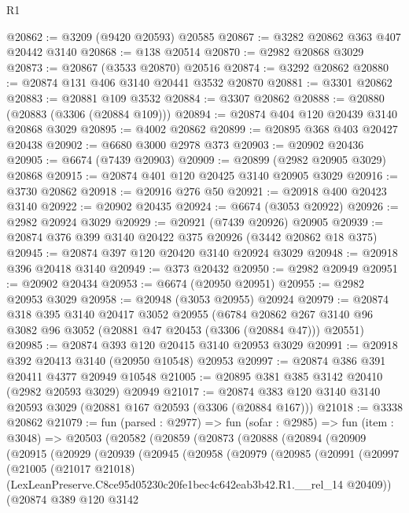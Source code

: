 \begin{lexlean}{R1}
\begin{coremodule}
@20862 := @3209 (@9420 @20593) @20585
@20867 := @3282 @20862 @363 @407 @20442 @3140
@20868 := @138 @20514
@20870 := @2982 @20868 @3029
@20873 := @20867 (@3533 @20870) @20516
@20874 := @3292 @20862
@20880 := @20874 @131 @406 @3140 @20441 @3532 @20870
@20881 := @3301 @20862
@20883 := @20881 @109 @3532
@20884 := @3307 @20862
@20888 := @20880 (@20883 (@3306 (@20884 @109)))
@20894 := @20874 @404 @120 @20439 @3140 @20868 @3029
@20895 := @4002 @20862
@20899 := @20895 @368 @403 @20427 @20438
@20902 := @6680 @3000 @2978 @373
@20903 := @20902 @20436
@20905 := @6674 (@7439 @20903)
@20909 := @20899 (@2982 @20905 @3029) @20868
@20915 := @20874 @401 @120 @20425 @3140 @20905 @3029
@20916 := @3730 @20862
@20918 := @20916 @276 @50
@20921 := @20918 @400 @20423 @3140
@20922 := @20902 @20435
@20924 := @6674 (@3053 @20922)
@20926 := @2982 @20924 @3029
@20929 := @20921 (@7439 @20926) @20905
@20939 := @20874 @376 @399 @3140 @20422 @375 @20926 (@3442 @20862 @18 @375)
@20945 := @20874 @397 @120 @20420 @3140 @20924 @3029
@20948 := @20918 @396 @20418 @3140
@20949 := @373 @20432
@20950 := @2982 @20949
@20951 := @20902 @20434
@20953 := @6674 (@20950 @20951)
@20955 := @2982 @20953 @3029
@20958 := @20948 (@3053 @20955) @20924
@20979 := @20874
    @318
    @395
    @3140
    @20417
    @3052
    @20955
    (@6784 @20862 @267 @3140 @96 @3082 @96 @3052 (@20881 @47 @20453 (@3306 (@20884 @47))) @20551)
@20985 := @20874 @393 @120 @20415 @3140 @20953 @3029
@20991 := @20918 @392 @20413 @3140 (@20950 @10548) @20953
@20997 := @20874 @386 @391 @20411 @4377 @20949 @10548
@21005 := @20895 @381 @385 @3142 @20410 (@2982 @20593 @3029) @20949
@21017 := @20874 @383 @120 @3140 @3140 @20593 @3029 (@20881 @167 @20593 (@3306 (@20884 @167)))
@21018 := @3338 @20862
@21079 := fun (parsed : @2977) =>
  fun (sofar : @2985) =>
  fun (item : @3048) =>
  @20503
    (@20582
      (@20859
        (@20873
          (@20888
            (@20894
              (@20909
                (@20915
                  (@20929
                    (@20939
                      (@20945
                        (@20958
                          (@20979
                            (@20985
                              (@20991
                                (@20997
                                  (@21005
                                    (@21017 @21018)
                                    (LexLeanPreserve.C8ce95d05230c20fe1bec4c642eab3b42.R1.__rel_14
                                      @20409))
                                  (@20874
                                    @389
                                    @120
                                    @3142

\end{coremodule}
\end{lexlean}
